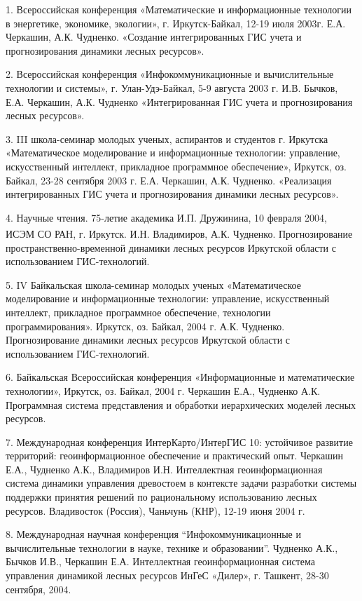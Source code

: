 \documentclass{article}
\begin{document}
1. Всероссийская конференция «Математические 
и информационные технологии в энергетике, экономике, 
экологии», г. Иркутск-Байкал, 12-19 июля 2003г. Е.А. 
Черкашин, А.К. Чудненко. «Создание интегрированных 
ГИС учета и прогнозирования динамики лесных 
ресурсов».

2. Всероссийская конференция «Инфокоммуникационные 
и вычислительные технологии и системы», г. Улан-Удэ-Байкал, 
5-9 августа 2003 г. И.В. Бычков, Е.А. Черкашин, А.К. 
Чудненко «Интегрированная ГИС учета и прогнозирования 
лесных ресурсов».

3. III школа-семинар молодых ученых, аспирантов 
и студентов г. Иркутска «Математическое моделирование 
и информационные технологии: управление, искусственный 
интеллект, прикладное программное обеспечение», 
Иркутск, оз. Байкал, 23-28 сентября 2003 г. Е.А. Черкашин, 
А.К. Чудненко. «Реализация интегрированных 
ГИС учета и прогнозирования динамики лесных 
ресурсов».

4. Научные чтения. 75-летие академика И.П. Дружинина, 
10 февраля 2004, ИСЭМ СО РАН, г. Иркутск. И.Н.\textsuperscript{ 
 }Владимиров, А.К. Чудненко. Прогнозирование 
пространственно-временной динамики лесных 
ресурсов Иркутской области с использованием 
ГИС-технологий. 

5. IV Байкальская школа-семинар молодых ученых 
«Математическое моделирование и информационные 
технологии: управление, искусственный интеллект, 
прикладное программное обеспечение, технологии 
программирования». Иркутск, оз. Байкал, 2004 г. 
А.К. Чудненко. Прогнозирование динамики лесных 
ресурсов Иркутской области с использованием 
ГИС-технологий. 

6. Байкальская Всероссийская конференция «Информационные 
и математические технологии», Иркутск, оз. Байкал, 
2004 г. Черкашин Е.А., Чудненко А.К. Программная 
система представления и обработки иерархических 
моделей лесных ресурсов. 

7. Международная конференция ИнтерКарто/ИнтерГИС 
10: устойчивое развитие территорий: геоинформационное 
обеспечение и практический опыт. Черкашин Е.А., 
Чудненко А.К., Владимиров И.Н. Интеллектная геоинформационная 
система динамики управления древостоем в контексте 
задачи разработки системы поддержки принятия 
решений по рациональному использованию лесных 
ресурсов. Владивосток (Россия), Чаньчунь (КНР), 
12-19 июня 2004 г.

8. Международная научная конференция ``Инфокоммуникационные 
и вычислительные технологии в науке, технике 
и образовании''. Чудненко А.К., Бычков И.В., Черкашин 
Е.А. Интеллектная геоинформационная система 
управления динамикой лесных ресурсов ИнГеС 
«Дилер», г. Ташкент, 28-30 сентября, 2004.
\end{document}
